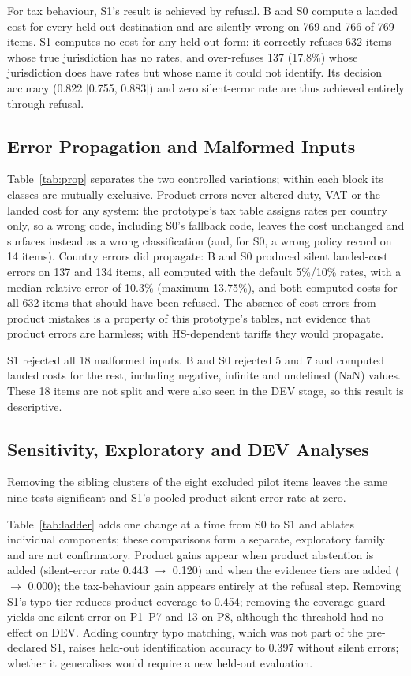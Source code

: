 \documentclass[conference]{IEEEtran}
\begin{document}
For tax behaviour, S1's result is achieved by refusal. B and S0 compute a landed cost for every held-out destination
and are silently wrong on 769 and 766 of 769 items. S1 computes no cost for any held-out form: it correctly refuses 632
items whose true jurisdiction has no rates, and over-refuses 137 (17.8\%) whose jurisdiction does have rates but whose
name it could not identify. Its decision accuracy (0.822 [0.755, 0.883]) and zero silent-error rate are thus achieved
entirely through refusal.



\subsection{Error Propagation and Malformed Inputs}
Table~\ref{tab:prop} separates the two controlled variations; within each block its classes are
mutually exclusive. Product errors never altered
duty, VAT or the landed cost for any system: the prototype's tax table assigns rates per country only, so a wrong code, including S0's fallback code, leaves the cost unchanged and surfaces instead as a wrong classification (and, for S0, a wrong
policy record on 14 items). Country errors did propagate: B and S0 produced silent landed-cost errors on 137 and 134
items, all computed with the default 5\%/10\% rates, with a median relative error of 10.3\% (maximum 13.75\%), and both
computed costs for all 632 items that should have been refused. The absence of cost errors from product mistakes is a
property of this prototype's tables, not evidence that product errors are harmless; with HS-dependent tariffs they
would propagate.



S1 rejected all 18 malformed inputs. B and S0 rejected 5 and 7 and computed
landed costs for the rest, including negative, infinite and undefined (NaN) values. These 18 items are not split and
were also seen in the DEV stage, so this result is descriptive.

\subsection{Sensitivity, Exploratory and DEV Analyses}
Removing the sibling clusters of the eight excluded pilot items leaves the same nine tests
significant and S1's pooled product silent-error rate at zero.

Table~\ref{tab:ladder} adds one change at a time from S0 to S1 and ablates individual
components; these comparisons form a separate, exploratory family and are not confirmatory. Product gains appear when
product abstention is added (silent-error rate 0.443 $\rightarrow$ 0.120) and when the evidence tiers are added
($\rightarrow$ 0.000); the tax-behaviour gain appears entirely at the refusal step. Removing S1's typo tier reduces
product coverage to 0.454; removing the coverage guard yields one silent error on P1--P7 and 13 on P8, although the
threshold had no effect on DEV. Adding country typo matching, which was not part of the pre-declared S1, raises held-out
identification accuracy to 0.397 without silent errors; whether it generalises would require a new held-out evaluation.
\end{document}
